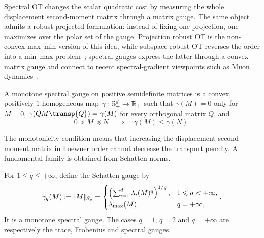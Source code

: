Spectral OT changes the scalar quadratic cost by measuring the whole displacement second-moment matrix through a matrix gauge. The same object admits a robust projected formulation: instead of fixing one projection, one maximizes over the polar set of the gauge. Projection robust OT is the non-convex max--min version of this idea, while subspace robust OT reverses the order into a min--max problem~\cite{paty2019subspace}; spectral gauges express the latter through a convex matrix gauge and connect to recent spectral-gradient viewpoints such as Muon dynamics~\cite{peyre2026muon}.

\begin{defn}\label{def-monotone-spectral-gauge}
	A monotone spectral gauge on positive semidefinite matrices is a convex, positively $1$-homogeneous map $\gamma:\mathbb S_+^d\to\mathbb{R}_+$ such that $\gamma(M)=0$ only for $M=0$, $\gamma(QM\transp{Q})=\gamma(M)$ for every orthogonal matrix $Q$, and
	\[
		0\preceq M\preceq N
		\quad\Longrightarrow\quad
		\gamma(M)\leq\gamma(N).
	\]
\end{defn}
The monotonicity condition means that increasing the displacement second-moment matrix in Loewner order cannot decrease the transport penalty. A fundamental family is obtained from Schatten norms.

\begin{defn}\label{def-schatten-gauge}
	For $1\leq q\leq+\infty$, define the Schatten gauge by
	\[
		\gamma_q(M)\coloneqq|\!| M |\!|_{S_q}
		=
		\begin{cases}
			\left( \sum_{i=1}^d\lambda_i(M)^q \right)^{1/q}, & 1\leqslant q<+\infty,\\
			\lambda_{\max}(M), & q=+\infty,
		\end{cases}.
	\]
	It is a monotone spectral gauge. The cases $q=1$, $q=2$ and $q=+\infty$ are respectively the trace, Frobenius and spectral gauges.
\end{defn}

